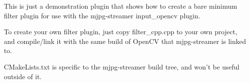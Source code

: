 This is just a demonstration plugin that shows how to create a bare minimum filter plugin for use with the mjpg-\/streamer input\+\_\+opencv plugin.

To create your own filter plugin, just copy filter\+\_\+cpp.\+cpp to your own project, and compile/link it with the same build of Open\+C\+V that mjpg-\/streamer is linked to.

C\+Make\+Lists.\+txt is specific to the mjpg-\/streamer build tree, and won't be useful outside of it. 